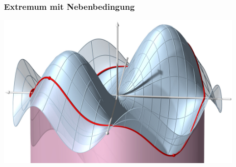 %
%
%
\bgroup
\begin{frame}[t]
\setlength{\abovedisplayskip}{5pt}
\setlength{\belowdisplayskip}{5pt}
\frametitle{Extremum mit Nebenbedingung}
\vspace*{-0.2cm}
\begin{center}
\includegraphics[width=12.3cm]{../../buch/chapters/010-fuvar/images/lagrangekurve.jpg}
\end{center}
\end{frame}
\egroup
